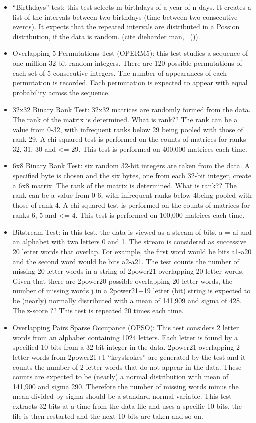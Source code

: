 \begin{itemize}
\item “Birthdays” test: this test selects m birthdays of a year of n days. It creates a list of the intervals between two birthdays (time between two consecutive events). It expects that the repeated intervals are distributed in a Possion distribution, if the data is random. (cite dieharder man, ~(\cite{10.1145/3447773})). 
\item Overlapping 5-Permutations Test (OPERM5): this test studies a sequence of one million 32-bit random integers. There are 120 possible permutations of each set of 5 consecutive integers. The number of appearances of each permutation is recorded. Each permutation is expected to appear with equal probability across the sequence.
\item 32x32 Binary Rank Test:  32x32 matrices are randomly formed from the data. The rank of the matrix is determined. What is rank?? The rank can be a value from 0-32, with infrequent ranks below 29 being pooled with those of rank 29. A chi-squared test is performed on the counts of matrices for ranks 32, 31, 30 and <= 29. This test is performed on 400,000 matrices each time.
\item 6x8 Binary Rank Test: six random 32-bit integers are taken from the data. A specified byte is chosen and the six bytes, one from each 32-bit integer, create a 6x8 matrix. The rank of the matrix is determined. What is rank?? The rank can be a value from 0-6, with infrequent ranks below 4being pooled with those of rank 4. A chi-squared test is performed on the counts of matrices for ranks 6, 5 and <= 4.  This test is performed on 100,000 matrices each time.
\item Bitstream Test: in this test, the data is viewed as a stream of bits, a = {ai} and an alphabet with two letters 0 and 1. The stream is considered as successive 20 letter words that overlap. For example, the first word would be bits a1-a20 and the second word would be bits a2-a21. The test counts the number of missing 20-letter words in a string of 2power21 overlapping 20-letter words. Given that there are 2power20  possible overlapping 20-letter words, the number of missing words j in a 2power21+19 letter (bit) string is expected to be (nearly) normally distributed with a mean of 141,909 and sigma of 428. The z-score ?? This test is repeated 20 times each time. 
\item Overlapping Pairs Sparse Occupance (OPSO): This test considers 2 letter words from an alphabet containing 1024 letters. Each letter is found by a specified 10 bits from a 32-bit integer in the data. 2power21 overlapping 2-letter words from 2power21+1 “keystrokes” are generated by the test and it counts the number of 2-letter words that do not appear in the data. These counts are expected to be (nearly) a normal distribution with mean of 141,900 and sigma 290. Therefore the number of missing words minus the mean divided by sigma should be a standard normal variable. This test extracts 32 bits at a time from the data file and uses a specific 10 bits, the file is then restarted and the next 10 bits are taken and so on.

\end{itemize}
